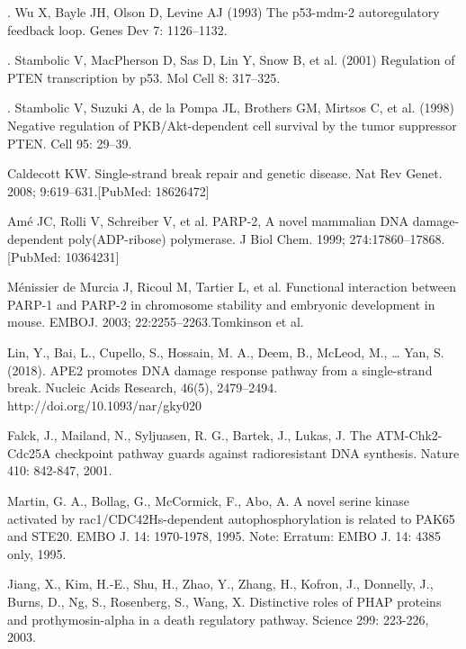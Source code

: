 \documentclass[preprint, 8pt]{elsarticle}
\theoremstyle{definition}
\begin{document}
\begin{table}[H]
\begin{thebibliography}{00}
. Wu X, Bayle JH, Olson D, Levine AJ (1993) 
\newblock The p53-mdm-2 autoregulatory feedback loop. 
\newblock Genes Dev 7: 1126–1132.

. Stambolic V, MacPherson D, Sas D, Lin Y, Snow B, et al. (2001) 
\newblock Regulation of PTEN transcription by p53. 
\newblock Mol Cell 8: 317–325.

. Stambolic V, Suzuki A, de la Pompa JL, Brothers GM, Mirtsos C, et al. (1998)
\newblock Negative regulation of PKB/Akt-dependent cell survival by the tumor suppressor 
\newblock PTEN. Cell 95: 29–39.

Caldecott KW. 
\newblock Single-strand break repair and genetic disease. 
\newblock Nat Rev Genet. 2008; 9:619–631.[PubMed: 18626472]

Amé JC, Rolli V, Schreiber V, et al. 
\newblock PARP-2, A novel mammalian DNA damage-dependent poly(ADP-ribose) polymerase. 
\newblock J Biol Chem. 1999; 274:17860–17868. [PubMed: 10364231]

Ménissier de Murcia J, Ricoul M, Tartier L, et al. 
\newblock Functional interaction between PARP-1 and PARP-2 in chromosome stability and embryonic development in mouse. 
\newblock EMBOJ. 2003; 22:2255–2263.Tomkinson et al.

 Lin, Y., Bai, L., Cupello, S., Hossain, M. A., Deem, B., McLeod, M., … Yan, S. (2018). 
\newblock APE2 promotes DNA damage response pathway from a single-strand break.
\newblock Nucleic Acids Research, 46(5), 2479–2494. http://doi.org/10.1093/nar/gky020

 Falck, J., Mailand, N., Syljuasen, R. G., Bartek, J., Lukas, J. 
\newblock The ATM-Chk2-Cdc25A checkpoint pathway guards against radioresistant DNA synthesis. 
\newblock Nature 410: 842-847, 2001. 

Martin, G. A., Bollag, G., McCormick, F., Abo, A. 
\newblock A novel serine kinase activated by rac1/CDC42Hs-dependent autophosphorylation is related to PAK65 and STE20. 
\newblock EMBO J. 14: 1970-1978, 1995. Note: Erratum: EMBO J. 14: 4385 only, 1995. 

Jiang, X., Kim, H.-E., Shu, H., Zhao, Y., Zhang, H., Kofron, J., Donnelly, J., Burns, D., Ng, S., Rosenberg, S., Wang, X. 
\newblock Distinctive roles of PHAP proteins and prothymosin-alpha in a death regulatory pathway. 
\newblock Science 299: 223-226, 2003.


\end{thebibliography}
\end{table}
\end{document}
